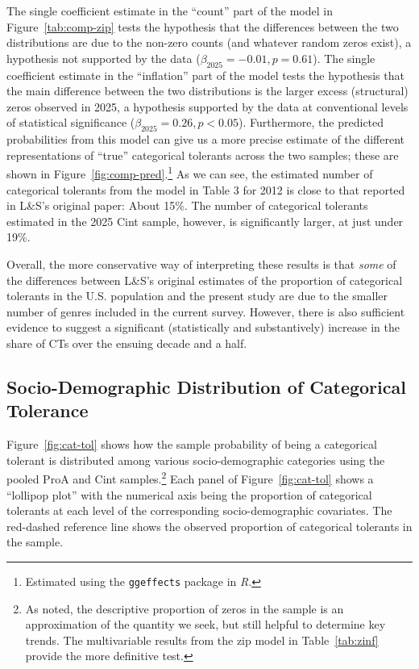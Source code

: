 \documentclass[12pt]{article}
\begin{document}
The single coefficient estimate in the ``count'' part of the model in Figure~\ref{tab:comp-zip} tests the hypothesis that the differences between the two distributions are due to the non-zero counts (and whatever random zeros exist), a hypothesis not supported by the data ($\beta_{2025} = -0.01, p = 0.61$). The single coefficient estimate in the ``inflation'' part of the model tests the hypothesis that the main difference between the two distributions is the larger excess (structural) zeros observed in 2025, a hypothesis supported by the data at conventional levels of statistical significance ($\beta_{2025} = 0.26, p < 0.05$). Furthermore, the predicted probabilities from this model can give us a more precise estimate of the different representations of ``true'' categorical tolerants across the two samples; these are shown in Figure~\ref{fig:comp-pred}.\footnote{Estimated using the \texttt{ggeffects} package in \textit{R}.} As we can see, the estimated number of categorical tolerants from the model in Table 3 for 2012 is close to that reported in L\&S's original paper: About 15\%. The number of categorical tolerants estimated in the 2025 Cint sample, however, is significantly larger, at just under 19\%.

Overall, the more conservative way of interpreting these results is that \textit{some} of the differences between L\&S's original estimates of the proportion of categorical tolerants in the U.S. population and the present study are due to the smaller number of genres included in the current survey. However, there is also sufficient evidence to suggest a significant (statistically and substantively) increase in the share of CTs over the ensuing decade and a half. 

\subsection*{Socio-Demographic Distribution of Categorical Tolerance}
Figure~\ref{fig:cat-tol} shows how the sample probability of being a categorical tolerant is distributed among various socio-demographic categories using the pooled ProA and Cint samples.\footnote{As noted, the descriptive proportion of zeros in the sample is an approximation of the quantity we seek, but still helpful to determine key trends. The multivariable results from the zip model in Table~\ref{tab:zinf} provide the more definitive test.} Each panel of Figure~\ref{fig:cat-tol} shows a ``lollipop plot'' with the numerical axis being the proportion of categorical tolerants at each level of the corresponding socio-demographic covariates. The red-dashed reference line shows the observed proportion of categorical tolerants in the sample. 
\end{document}
